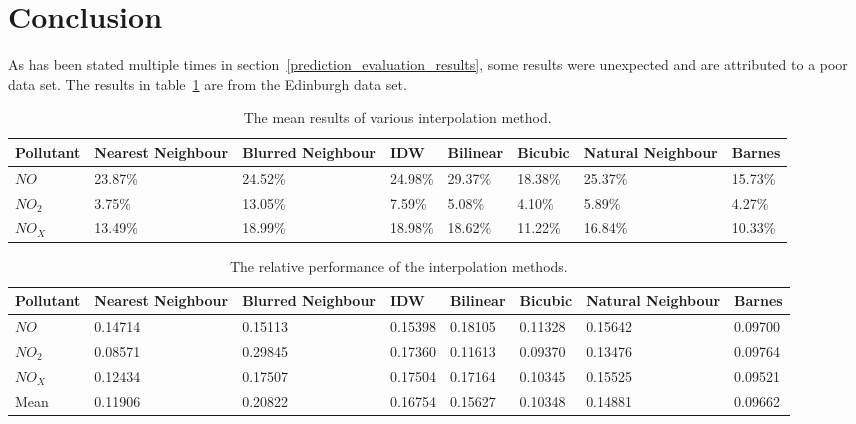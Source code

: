 	\section{Conclusion}

		As has been stated multiple times in section~\ref{prediction_evaluation_results}, some results were unexpected and are attributed to a poor data set. The results in table~\ref{tab:all_results} are from the Edinburgh data set. 

		\begin{table}
			\centering
    		\begin{tabularx}{\linewidth}{|X|X|X|X|X|X|X|X|}
    			\hline
				Pollutant & Nearest Neighbour & Blurred Neighbour & IDW & Bilinear & Bicubic & Natural Neighbour & Barnes \\ \hline
				$NO$ & 23.87\% & 24.52\% & 24.98\% & 29.37\% & 18.38\% & 25.37\% & 15.73\% \\
				$NO_{2}$ & 3.75\% & 13.05\% & 7.59\% & 5.08\% & 4.10\% & 5.89\% & 4.27\% \\
				$NO_{X}$ & 13.49\% & 18.99\% & 18.98\% & 18.62\% & 11.22\% & 16.84\% & 10.33\% \\
				\hline
			\end{tabularx}
			\caption{The mean results of various interpolation method.}
			\label{tab:all_results}
		\end{table}

		

		\begin{table}
			\centering
    		\begin{tabularx}{\linewidth}{|X|X|X|X|X|X|X|X|}
    			\hline
				Pollutant & Nearest Neighbour & Blurred Neighbour & IDW & Bilinear & Bicubic & Natural Neighbour & Barnes \\ \hline
				$NO$ & 0.14714 & 0.15113 & 0.15398 & 0.18105 & 0.11328 & 0.15642 & 0.09700 \\
				$NO_{2}$ & 0.08571 & 0.29845 & 0.17360 & 0.11613 & 0.09370 & 0.13476 & 0.09764\\
				$NO_{X}$ & 0.12434 & 0.17507 & 0.17504 & 0.17164 & 0.10345 & 0.15525 & 0.09521 \\ \hline
				Mean & 0.11906 & 0.20822 & 0.16754 & 0.15627 & 0.10348 & 0.14881 & 0.09662 \\
				\hline
			\end{tabularx}
			\caption{The relative performance of the interpolation methods.}
			\label{tab:all_ratio_results}
		\end{table}

